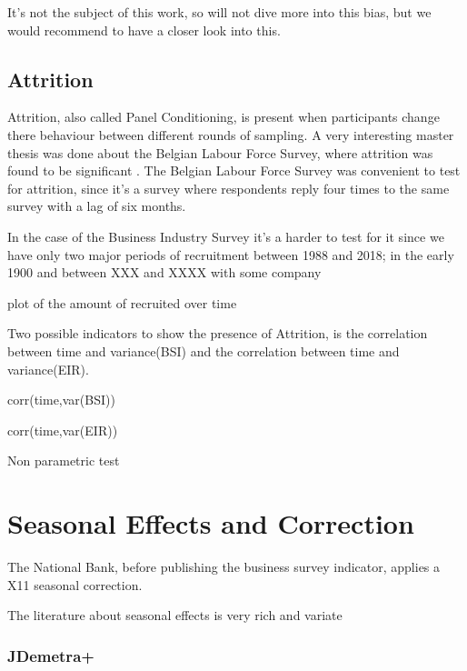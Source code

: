 \documentclass[12pt,a4paper,oneside]{book}
\begin{document}
It's not the subject of this work, so will not dive more into this bias, but we would recommend to have a closer look into this.

\subsection{Attrition}
Attrition, also called Panel Conditioning, is present when participants change there behaviour between different rounds of sampling. 
A very interesting master thesis was done about the Belgian Labour Force Survey, where attrition was found to be significant \cite{priyana_hardjawidjaksana_investigating_2019}. 
The Belgian Labour Force Survey was convenient to test for attrition, since it's a survey where respondents reply four times to the same survey with a lag of six months.

In the case of the Business Industry Survey it's a harder to test for it since we have only two major periods of recruitment between 1988 and 2018; in the early 1900 and between XXX and XXXX with some company 

plot of the amount of recruited over time

Two possible indicators to show the presence of Attrition, is the correlation between time and variance(BSI) and the correlation between time and variance(EIR).

corr(time,var(BSI))

corr(time,var(EIR))



Non parametric test \cite{das_nonparametric_2011}


\section{Seasonal Effects and Correction}
The National Bank, before publishing the business survey indicator, applies a X11 seasonal correction.

The literature about seasonal effects is very rich and variate


\subsubsection{JDemetra+}

\end{document}
